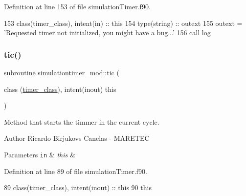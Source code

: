 Definition at line 153 of file simulation\+Timer.\+f90.


\begin{DoxyCode}
153     \textcolor{keywordtype}{class}(timer\_class), \textcolor{keywordtype}{intent(in)} :: this
154     \textcolor{keywordtype}{type}(string) :: outext
155     outext = \textcolor{stringliteral}{'Requested timer not initialized, you might have a bug...'}
156     \textcolor{keyword}{call }log%
\end{DoxyCode}
\mbox{\label{namespacesimulationtimer__mod_a0924f340c4f5785a5981bdc99226e576}} 
\subsubsection{\texorpdfstring{tic()}{tic()}}
{\footnotesize\ttfamily subroutine simulationtimer\+\_\+mod\+::tic (\begin{DoxyParamCaption}\item[{class (\mbox{\hyperlink{structsimulationtimer__mod_1_1timer__class}{timer\+\_\+class}}), intent(inout)}]{this }\end{DoxyParamCaption})\hspace{0.3cm}{\ttfamily [private]}}



Method that starts the timmer in the current cycle. 

\begin{DoxyAuthor}{Author}
Ricardo Birjukovs Canelas -\/ M\+A\+R\+E\+T\+EC 
\end{DoxyAuthor}

\begin{DoxyParams}[1]{Parameters}
\mbox{\tt in}  & {\em this} & \\
\hline
\end{DoxyParams}


Definition at line 89 of file simulation\+Timer.\+f90.


\begin{DoxyCode}
89     class(timer\_class), \textcolor{keywordtype}{intent(inout)} :: this
90     this%
\end{DoxyCode}
\mbox{\label{namespacesimulationtimer__mod_ae5c4ca42de2cd1f446eee79112cedd14}} 
